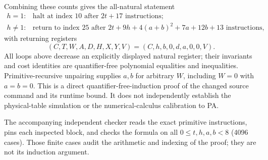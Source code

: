 Combining these counts gives the all-natural statement
\[
 \begin{array}{ll}
 h=1:&\text{halt at index 10 after }2t+17\text{ instructions};\\[2pt]
 h\ne1:&\text{return to index 25 after }
 2t+9h+4(a+b)^2+7a+12b+13\text{ instructions},
 \end{array}
\]
with returning registers
\[
 (C,T,W,A,D,H,X,Y,V)=(C,h,b,0,d,a,0,0,V).
\]
All loops above decrease an explicitly displayed natural register; their
invariants and cost identities are quantifier-free polynomial equalities
and inequalities.  Primitive-recursive unpairing supplies $a,b$ for
arbitrary $W$, including $W=0$ with $a=b=0$.  This is a direct
quantifier-free-induction proof of the changed source command and its
runtime bound.  It does not independently establish the physical-table
simulation or the numerical-calculus calibration to PA.

The accompanying independent checker reads the exact primitive
instructions, pins each inspected block, and checks the formula on all
$0\le t,h,a,b<8$ (4096 cases).  Those finite cases audit the arithmetic
and indexing of the proof; they are not its induction argument.
